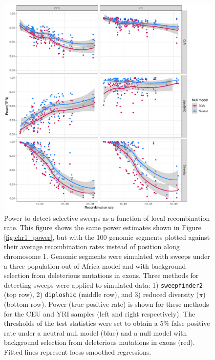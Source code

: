 \documentclass[hidelinks]{article}
\newcommand{\sweepfinder}{\texttt{sweepfinder2}\xspace}
\newcommand{\diploshic}{\texttt{diploshic}\xspace}
\begin{document}
    \begin{figure}[b!]
        \centering
        \includegraphics[width=0.8 \textwidth]{figures/sweeps/relationship_power_cM.pdf}
        \caption{
        Power to detect selective sweeps 
        as a function of local recombination rate.
        This figure shows the same power estimates shown in Figure \ref{fig:chr1_power},
        but with the 100 genomic segments plotted against their
        average recombination rates instead of position along chromosome 1.
    	Genomic segments were simulated with sweeps under a three population out-of-Africa model
        \citep{gutenkunst2009inferring} and with background selection from deleterious mutations in exons.
        Three methods for detecting sweeps were applied to simulated data:
        1) \sweepfinder \citep{degiorgio2016sweepfinder2} (top row),
        2) \diploshic \citep{kern2018diplos} (middle row),
        and 3) reduced diversity ($\pi$) (bottom row).
        Power (true positive rate) is shown for these methods for the CEU and YRI
        samples (left and right respectively).
        The thresholds of the test statistics were set to obtain a
        $5\%$ false positive rate under a neutral null model (blue)
        and a null model with background selection from deleterious mutations in exons (red).
        Fitted lines represent loess smoothed regressions.
        }
        \label{fig:power-recomb}
    \end{figure}
\end{document}
